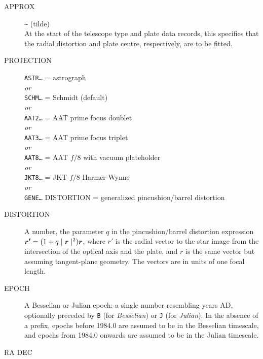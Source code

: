 \documentclass[twoside,11pt]{article}
\newcommand{\xlabel}[1]{}
\renewcommand{\_}{\texttt{\symbol{95}}}
\begin{document}
\begin{description}
\goodbreak
\item[\xlabel{APPROX}APPROX]\mbox{}

 \verb|~| (tilde) \\
At the start of the telescope type and plate data
records, this specifies that the radial
distortion and plate centre, respectively, are to be fitted.

\goodbreak
\item[\xlabel{PROJECTION}PROJECTION]\mbox{}

 \texttt{ASTR\ldots} = astrograph \\
 \textit{or} \\
 \texttt{SCHM\ldots} = Schmidt (default) \\
 \textit{or} \\
 \texttt{AAT2\ldots} = AAT prime focus doublet \\
 \textit{or} \\
 \texttt{AAT3\ldots} = AAT prime focus triplet \\
 \textit{or} \\
 \texttt{AAT8\ldots} = AAT $f/8$ with vacuum plateholder \\
 \textit{or} \\
 \texttt{JKT8\ldots} = JKT $f/8$ Harmer-Wynne \\
 \textit{or} \\
 \texttt{GENE\ldots} DISTORTION = generalized pincushion/barrel distortion

\goodbreak
\item[\xlabel{PROJECTION}DISTORTION]\mbox{}

A number, the parameter $q$ in the pincushion/barrel distortion expression
$\mbox{\boldmath $r'$}=(1+q\mid\mbox{\boldmath $r$}\mid^2)\mbox{\boldmath $r$}$,
where \mbox{\boldmath $r'$} is the radial vector to the star image
from the intersection of the optical axis and the plate,
and \mbox{\boldmath $r$} is the same vector but assuming tangent-plane
geometry.  The vectors are in units of one focal length.

\goodbreak
\item[\xlabel{EPOCH}EPOCH]\mbox{}

A Besselian or Julian epoch:  a single number resembling years AD,
optionally preceded by \texttt{B} (for \textit{Besselian}) or
\texttt{J} (for \textit{Julian}).  In the absence of a prefix, epochs
before 1984.0 are assumed to be in the Besselian timescale, and epochs
from 1984.0 onwards are assumed to be in the Julian timescale.

\goodbreak
\item[\xlabel{RA_DEC}RA DEC]\mbox{}


\end{description}
\end{document}
